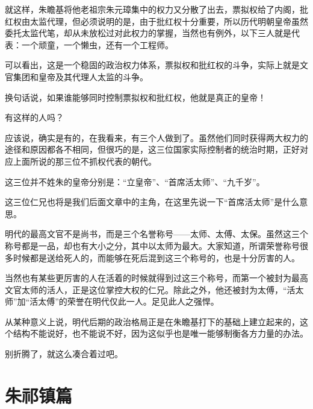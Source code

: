 \begin{multicols}{\theparacolNo}
就这样，朱瞻基将他老祖宗朱元璋集中的权力又分散了出去，票拟权给了内阁，批红权由太监代理，但必须说明的是，由于批红权十分重要，所以历代明朝皇帝虽然委托太监代笔，却从未放松过对此权力的掌握，当然也有例外，以下三人就是代表：一个顽童，一个懒虫，还有一个工程师。

可以看出，这是一个稳固的政治权力体系，票拟权和批红权的斗争，实际上就是文官集团和皇帝及其代理人太监的斗争。

换句话说，如果谁能够同时控制票拟权和批红权，他就是真正的皇帝！

有这样的人吗？

应该说，确实是有的，在我看来，有三个人做到了。虽然他们同时获得两大权力的途径和原因都各不相同，但很巧的是，这三位国家实际控制者的统治时期，正好对应上面所说的那三位不抓权代表的朝代。

这三位并不姓朱的皇帝分别是：“立皇帝”、“首席活太师”、“九千岁”。

这三位仁兄也将是我们后面文章中的主角，在这里先说一下“首席活太师”是什么意思。

明代的最高文官不是尚书，而是三个名誉称号——太师、太傅、太保。虽然这三个称号都是一品，却也有大小之分，其中以太师为最大。大家知道，所谓荣誉称号很多时候都是送给死人的，而能够在死后混到这三个称号的，也是十分厉害的人。

当然也有某些更厉害的人在活着的时候就得到过这三个称号，而第一个被封为最高文官太师的活人，正是这位掌控大权的仁兄。除此之外，他还被封为太傅，“活太师”加“活太傅”的荣誉在明代仅此一人。足见此人之强悍。

从某种意义上说，明代后期的政治格局正是在朱瞻基打下的基础上建立起来的，这个结构不能说好，也不能说不好，因为这似乎也是唯一能够制衡各方力量的办法。

别折腾了，就这么凑合着过吧。
\ifnum{}
	\end{multicols}
\fi
\newpage
\chapter*{朱祁镇篇}
